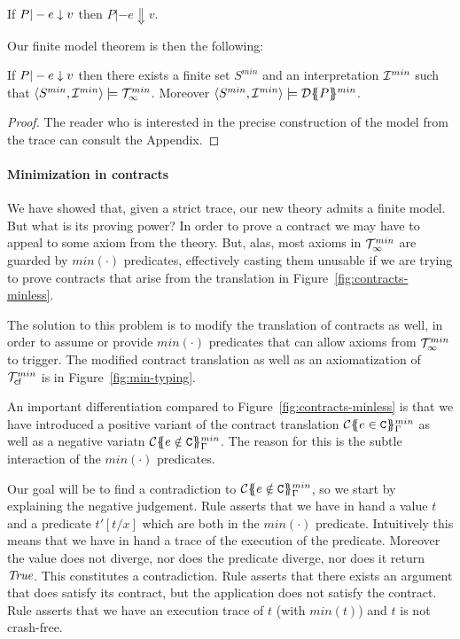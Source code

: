 \begin{lemma}
If $P |- e \downarrow v$ then $P |- e \Downarrow v$.
\end{lemma} 

Our finite model theorem is then the following:

\begin{theorem}\label{thm:finite-model} If $P |- e \downarrow v$ then there exists 
a finite set $S^{min}$ and an interpretation ${\cal I}^{min}$ such that 
$\langle S^{min},{\cal I}^{min}\rangle \models {\cal T}_{\infty}^{min}$. Moreover 
$\langle S^{min},{\cal I}^{min}\rangle \models {\cal D}\{\!\!\{P\}\!\!\}^{min}$. 
\end{theorem}
\begin{proof} The reader who is interested in the precise 
construction of the model from the trace can consult the 
Appendix. 
\end{proof}

\paragraph{Minimization in contracts}
\newcommand{\ctransmin}[3]{\ctrans{#1}{#2}{#3}^{min}} 
\newcommand{\calI}{{\cal J}}

We have showed that, given a strict trace, our new theory admits a finite model. But what is its proving 
power? In order to prove a contract we may have to appeal to some axiom from the theory. But, alas, most
axioms in ${\cal T}_{\infty}^{min}$ are guarded by $min(\cdot)$ predicates, effectively casting them unusable if we are 
trying to prove contracts that arise from the translation in Figure~\ref{fig:contracts-minless}.

The solution to this problem is to modify the translation of contracts as well, in order to assume 
or provide $min(\cdot)$ predicates that can allow axioms from ${\cal T}_{\infty}^{min}$ to trigger. The modified 
contract translation as well as an axiomatization of ${\cal T}_{\textsf{cf}}^{min}$ is in Figure~\ref{fig:min-typing}.

An important differentiation compared to Figure~\ref{fig:contracts-minless} is that we have introduced
a positive variant of the contract translation $\ctransmin{}{\Gamma}{e \in \Ct}$ as well as a 
negative variatn $\ctransmin{}{\Gamma}{e \notin \Ct}$. The reason for this is the subtle interaction of
the $min(\cdot)$ predicates. 

Our goal will be to find a contradiction to $\ctransmin{}{\Gamma}{e \notin \Ct}$, so we start by explaining
the negative judgement. Rule  asserts that we have in hand a value $t$ and a predicate 
$t'[t/x]$ which are both in the $min(\cdot)$ predicate. Intuitively this means that we have in hand a trace 
of the execution of the predicate. Moreover the value does not diverge, nor does the predicate diverge, nor
does it return $\textit{True}$. This constitutes a contradiction. Rule  asserts that there exists an
argument that does satisfy its contract, but the application does not satisfy the contract. Rule 
asserts that we have an execution trace of $t$ (with $min(t)$) and $t$ is not crash-free.

